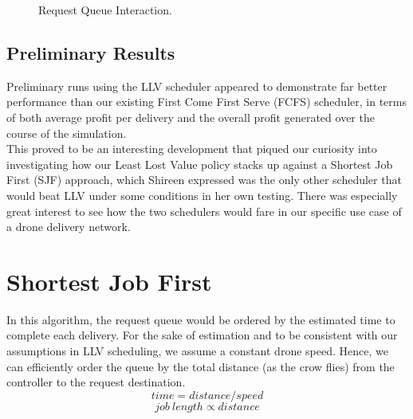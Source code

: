 \documentclass[a4paper,11pt,titlepage]{report}
\begin{document}
\begin{figure}[!hbpt]
 \centering
 \caption{Request Queue Interaction.}
 \label{fig:request_queue_interaction}
 \end{figure}

\subsection{Preliminary Results}
Preliminary runs using the LLV scheduler appeared to demonstrate far better performance than our existing First Come First Serve (FCFS) scheduler, in terms of both average profit per delivery and the overall profit generated over the course of the simulation.\\

This proved to be an interesting development that piqued our curiosity into investigating how our Least Lost Value policy stacks up against a Shortest Job First (SJF) approach, which Shireen expressed was the only other scheduler that would beat LLV under some conditions in her own testing. There was especially great interest to see how the two schedulers would fare in our specific use case of a drone delivery network.

\clearpage
\section{Shortest Job First}
In this algorithm, the request queue would be ordered by the estimated time to complete each delivery. For the sake of estimation and to be consistent with our assumptions in LLV scheduling, we assume a constant drone speed. Hence, we can efficiently order the queue by the total distance (as the crow flies) from the controller to the request destination.
$$ time = distance / speed $$
$$ job\ length \propto distance $$
\end{document}
